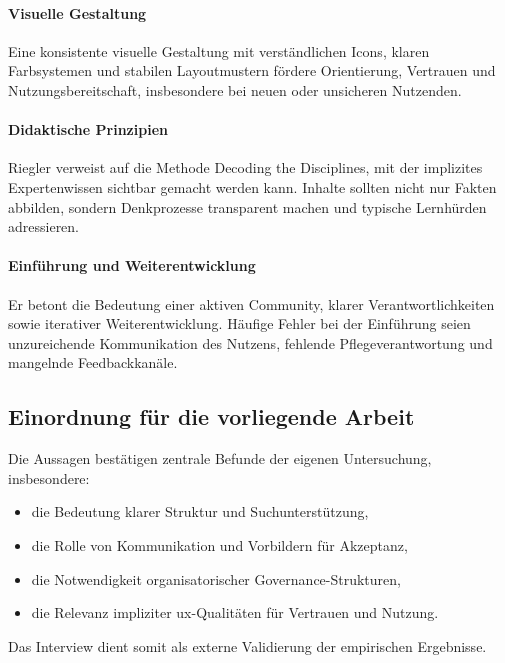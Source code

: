 \paragraph{Visuelle Gestaltung}
Eine konsistente visuelle Gestaltung mit verständlichen Icons, klaren Farbsystemen und stabilen Layoutmustern fördere Orientierung, Vertrauen und Nutzungsbereitschaft, insbesondere bei neuen oder unsicheren Nutzenden.

\paragraph{Didaktische Prinzipien}
Riegler verweist auf die Methode \glqq Decoding the Disciplines\grqq{}, mit der implizites Expertenwissen sichtbar gemacht werden kann. Inhalte sollten nicht nur Fakten abbilden, sondern Denkprozesse transparent machen und typische Lernhürden adressieren.

\paragraph{Einführung und Weiterentwicklung}
Er betont die Bedeutung einer aktiven Community, klarer Verantwortlichkeiten sowie iterativer Weiterentwicklung. Häufige Fehler bei der Einführung seien unzureichende Kommunikation des Nutzens, fehlende Pflegeverantwortung und mangelnde Feedbackkanäle.

\subsection{Einordnung für die vorliegende Arbeit}

Die Aussagen bestätigen zentrale Befunde der eigenen Untersuchung, insbesondere:
\begin{itemize}
    \item die Bedeutung klarer Struktur und Suchunterstützung,
    \item die Rolle von Kommunikation und Vorbildern für Akzeptanz,
    \item die Notwendigkeit organisatorischer Governance-Strukturen,
    \item die Relevanz impliziter \Gls{ux}-Qualitäten für Vertrauen und Nutzung.
\end{itemize}

Das Interview dient somit als externe Validierung der empirischen Ergebnisse.
